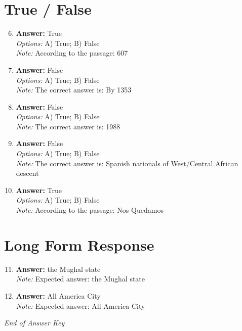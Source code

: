 \documentclass[12pt]{article}
\begin{document}
\section*{True / False}
\begin{enumerate}[label=\arabic*.]
\setcounter{enumi}{5}
\item \textbf{Answer:} True
\\ \textit{Options:} A) True; B) False
\\ \textit{Note:} According to the passage: 607
\item \textbf{Answer:} False
\\ \textit{Options:} A) True; B) False
\\ \textit{Note:} The correct answer is: By 1353
\item \textbf{Answer:} False
\\ \textit{Options:} A) True; B) False
\\ \textit{Note:} The correct answer is: 1988
\item \textbf{Answer:} False
\\ \textit{Options:} A) True; B) False
\\ \textit{Note:} The correct answer is: Spanish nationals of West/Central African descent
\item \textbf{Answer:} True
\\ \textit{Options:} A) True; B) False
\\ \textit{Note:} According to the passage: Nos Quedamos
\end{enumerate}

\section*{Long Form Response}
\begin{enumerate}[label=\arabic*.]
\setcounter{enumi}{10}
\item \textbf{Answer:} the Mughal state
\\ \textit{Note:} Expected answer: the Mughal state
\item \textbf{Answer:} All America City
\\ \textit{Note:} Expected answer: All America City
\end{enumerate}

\vfill
\noindent\textit{End of Answer Key}
\end{document}
